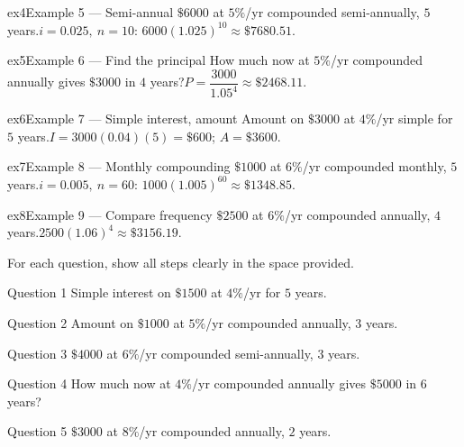 \documentclass[11pt]{article}
\begin{document}
\begin{example}{ex4}{Example 5 --- Semi-annual}
$\$6000$ at $5\%$/yr compounded semi-annually, $5$ years.\soln $i=0.025,\ n=10$: $6000(1.025)^{10}\approx\$7680.51$.
\end{example}

\begin{example}{ex5}{Example 6 --- Find the principal}
How much now at $5\%$/yr compounded annually gives $\$3000$ in $4$ years?\soln $P=\dfrac{3000}{1.05^{4}}\approx\$2468.11$.
\end{example}

\begin{example}{ex6}{Example 7 --- Simple interest, amount}
Amount on $\$3000$ at $4\%$/yr simple for $5$ years.\soln $I=3000(0.04)(5)=\$600$; $A=\$3600$.
\end{example}

\begin{example}{ex7}{Example 8 --- Monthly compounding}
$\$1000$ at $6\%$/yr compounded monthly, $5$ years.\soln $i=0.005,\ n=60$: $1000(1.005)^{60}\approx\$1348.85$.
\end{example}

\begin{example}{ex8}{Example 9 --- Compare frequency}
$\$2500$ at $6\%$/yr compounded annually, $4$ years.\soln $2500(1.06)^{4}\approx\$3156.19$.
\end{example}

\clearpage
{}
For each question, show all steps clearly in the space provided.

\begin{qbox}{Question 1}
Simple interest on $\$1500$ at $4\%$/yr for $5$ years.\workspace{2.4cm}
\end{qbox}

\begin{qbox}{Question 2}
Amount on $\$1000$ at $5\%$/yr compounded annually, $3$ years.\workspace{2.4cm}
\end{qbox}

\begin{qbox}{Question 3}
$\$4000$ at $6\%$/yr compounded semi-annually, $3$ years.\workspace{2.4cm}
\end{qbox}

\begin{qbox}{Question 4}
How much now at $4\%$/yr compounded annually gives $\$5000$ in $6$ years?\workspace{2.4cm}
\end{qbox}

\begin{qbox}{Question 5}
$\$3000$ at $8\%$/yr compounded annually, $2$ years.\workspace{2.4cm}
\end{qbox}
\end{document}
